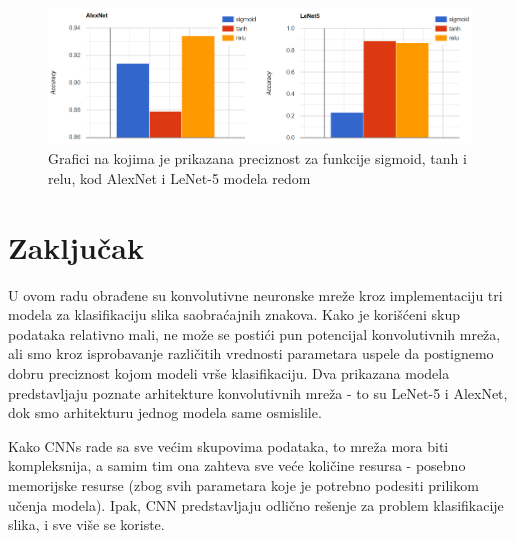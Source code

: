 \documentclass[a4paper]{article}
\begin{document}
\begin{figure}[h!]
\begin{center}
\includegraphics[scale=0.5]{graphs_alexnet_lenet.png}
\end{center}
\caption{Grafici na kojima je prikazana preciznost za funkcije sigmoid, tanh i relu, kod AlexNet i LeNet-5 modela redom}
\label{fig:accuracy_1}
\end{figure}

\newpage
\newpage
\section{Zaključak}
\label{sec:zakljucak}
U ovom radu obrađene su konvolutivne neuronske mreže kroz implementaciju tri modela za klasifikaciju slika saobraćajnih znakova. Kako je korišćeni skup podataka relativno mali, ne može se postići pun potencijal konvolutivnih mreža, ali smo kroz isprobavanje različitih vrednosti parametara uspele da postignemo dobru preciznost kojom modeli vrše klasifikaciju. Dva prikazana modela predstavljaju poznate arhitekture konvolutivnih mreža - to su LeNet-5 i AlexNet, dok smo arhitekturu jednog modela same osmislile.

Kako CNNs rade sa sve većim skupovima podataka, to mreža mora biti kompleksnija, a samim tim ona zahteva sve veće količine resursa - posebno memorijske resurse (zbog svih parametara koje je potrebno podesiti prilikom učenja modela). Ipak, CNN predstavljaju odlično rešenje za problem klasifikacije slika, i sve više se koriste.

\newpage

\appendix
 


\newpage

\appendix
\end{document}
